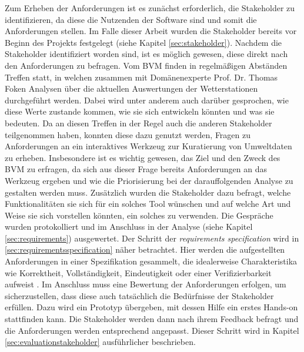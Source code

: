 Zum Erheben der Anforderungen ist es zunächst erforderlich, die Stakeholder zu identifizieren, da diese die Nutzenden der Software sind und somit die Anforderungen stellen. Im Falle dieser Arbeit wurden die Stakeholder bereits vor Beginn des Projekts festgelegt (siehe Kapitel \ref{sec:stakeholder}). Nachdem die Stakeholder identifiziert worden sind, ist es möglich gewesen, diese direkt nach den Anforderungen zu befragen. Vom \ac{BVM} finden in regelmäßigen Abständen Treffen statt, in welchen zusammen mit Domänenexperte Prof. Dr. Thomas Foken Analysen über die aktuellen Auswertungen der Wetterstationen durchgeführt werden. Dabei wird unter anderem auch darüber gesprochen, wie diese Werte zustande kommen, wie sie sich entwickeln könnten und was sie bedeuten. Da an diesen Treffen in der Regel auch die anderen Stakeholder teilgenommen haben, konnten diese dazu genutzt werden, Fragen zu Anforderungen an ein interaktives Werkzeug zur Kuratierung von Umweltdaten zu erheben. Insbesondere ist es wichtig gewesen, das Ziel und den Zweck des \ac{BVM} zu erfragen, da sich aus dieser Frage bereits Anforderungen an das Werkzeug ergeben und wie die Priorisierung bei der darauffolgenden Analyse zu gestalten werden muss. Zusätzlich wurden die Stakeholder dazu befragt, welche Funktionalitäten sie sich für ein solches Tool wünschen und auf welche Art und Weise sie sich vorstellen könnten, ein solches zu verwenden. Die Gespräche wurden protokolliert und im Anschluss in der Analyse (siehe Kapitel \ref{sec:requirements}) ausgewertet. Der Schritt der \textit{requirements specification} wird in \ref{sec:requirementsspecification} näher betrachtet. \newline Hier werden die aufgestellten Anforderungen in einer Spezifikation gesammelt, die idealerweise Charakteristika wie Korrektheit, Vollständigkeit, Eindeutigkeit oder einer Verifizierbarkeit aufweist \cite{institute1984ieee}. Im Anschluss muss eine Bewertung der Anforderungen erfolgen, um sicherzustellen, dass diese auch tatsächlich die Bedürfnisse der Stakeholder erfüllen. Dazu wird ein Prototyp übergeben, mit dessen Hilfe ein erstes Hands-on stattfinden kann. Die Stakeholder werden dann nach ihrem Feedback befragt und die Anforderungen werden entsprechend angepasst. Dieser Schritt wird in Kapitel \ref{sec:evaluationstakeholder} ausführlicher beschrieben. 

